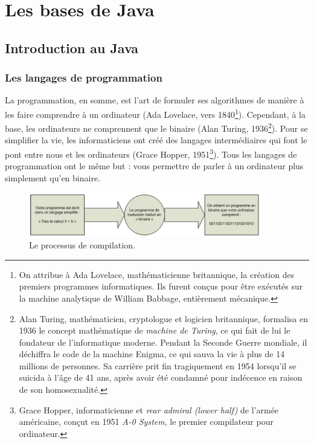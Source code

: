 \documentclass[12pt]{report}
\begin{document}

\part{Les bases de Java}

\chapter{Introduction au Java}
%
%
%
\section{Les langages de programmation}
La programmation, en somme, est l'art de formuler ses algorithmes de manière à les faire comprendre à un ordinateur (Ada Lovelace, vers 1840\footnote{On attribue à Ada Lovelace, mathématicienne britannique, la création des premiers programmes informatiques. Ils furent conçus pour être exécutés sur la machine analytique de William Babbage, entièrement mécanique.}). Cependant, à la base, les ordinateurs ne comprennent que le binaire (Alan Turing, 1936\footnote{Alan Turing, mathématicien, cryptologue et logicien britannique, formalisa en 1936 le concept mathématique de \emph{machine de Turing}, ce qui fait de lui le fondateur de l'informatique moderne. Pendant la Seconde Guerre mondiale, il déchiffra le code de la machine Enigma, ce qui sauva la vie à plus de 14 millions de personnes. Sa carrière prit fin tragiquement en 1954 lorsqu'il se suicida à l'âge de 41 ans, après avoir été condamné pour indécence en raison de son homosexualité.}). Pour se simplifier la vie, les informaticiens ont créé des langages intermédiaires qui font le pont entre nous et les ordinateurs (Grace Hopper, 1951\footnote{Grace Hopper, informaticienne et \emph{rear admiral (lower half)} de l'armée américaine, conçut en 1951 \emph{A-0 System}, le premier compilateur pour ordinateur.}). Tous les langages de programmation ont le même but : vous permettre de parler à un ordinateur plus simplement qu'en binaire.
%
%
%
\begin{figure}[!htbp]
  \centering
  \includegraphics[width=0.9\textwidth]{compilation.png}
  \caption{Le processus de compilation.}
\end{figure}
\end{document}
